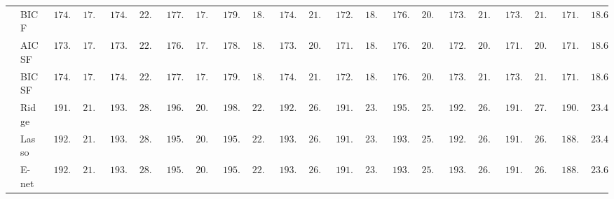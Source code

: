 \begin{tabular}{p{0.2cm}p{1cm}|p{0.6cm}p{0.6cm}|p{0.6cm}p{0.6cm}p{0.6cm}p{0.6cm}p{0.6cm}p{0.6cm}|p{0.6cm}p{0.6cm}p{0.6cm}p{0.6cm}p{0.6cm}p{0.6cm}|p{0.6cm}p{0.6cm}p{0.6cm}p{0.6cm}p{0.6cm}p{0.6cm}}
 & BIC F  & $\phantom{0}174.33$ & $\phantom{0}17.71$ & $\phantom{0}174.93$ & $\phantom{0}22.61$ & $\phantom{0}177.92$ & $\phantom{0}17.21$ & $\phantom{0}179.05$ & $\phantom{0}18.33$ & $\phantom{0}174.65$ & $\phantom{0}21.00$ & $\phantom{0}172.92$ & $\phantom{0}18.72$ & $\phantom{0}176.85$ & $\phantom{0}20.99$ & $\phantom{0}173.70$ & $\phantom{0}21.08$ & $\phantom{0}173.01$ & $\phantom{0}21.03$ & $\phantom{0}171.97$ & $\phantom{0}18.65$ \\
 & AIC SF  & $\phantom{0}173.23$ & $\phantom{0}17.57$ & $\phantom{0}173.84$ & $\phantom{0}22.43$ & $\phantom{0}176.76$ & $\phantom{0}17.03$ & $\phantom{0}178.14$ & $\phantom{0}18.35$ & $\phantom{0}173.35$ & $\phantom{0}20.89$ & $\phantom{0}171.88$ & $\phantom{0}18.53$ & $\phantom{0}176.00$ & $\phantom{0}20.94$ & $\phantom{0}172.67$ & $\phantom{0}20.86$ & $\phantom{0}171.87$ & $\phantom{0}20.90$ & $\phantom{0}171.12$ & $\phantom{0}18.64$ \\
 & BIC SF  & $\phantom{0}174.33$ & $\phantom{0}17.71$ & $\phantom{0}174.93$ & $\phantom{0}22.61$ & $\phantom{0}177.92$ & $\phantom{0}17.21$ & $\phantom{0}179.05$ & $\phantom{0}18.33$ & $\phantom{0}174.65$ & $\phantom{0}21.00$ & $\phantom{0}172.92$ & $\phantom{0}18.72$ & $\phantom{0}176.85$ & $\phantom{0}20.99$ & $\phantom{0}173.70$ & $\phantom{0}21.08$ & $\phantom{0}173.01$ & $\phantom{0}21.03$ & $\phantom{0}171.97$ & $\phantom{0}18.65$ \\
 & Ridge  & $\phantom{0}191.77$ & $\phantom{0}21.86$ & $\phantom{0}193.35$ & $\phantom{0}28.38$ & $\phantom{0}196.58$ & $\phantom{0}20.41$ & $\phantom{0}198.62$ & $\phantom{0}22.26$ & $\phantom{0}192.24$ & $\phantom{0}26.55$ & $\phantom{0}191.25$ & $\phantom{0}23.18$ & $\phantom{0}195.76$ & $\phantom{0}25.24$ & $\phantom{0}192.23$ & $\phantom{0}26.69$ & $\phantom{0}191.67$ & $\phantom{0}27.17$ & $\phantom{0}190.39$ & $\phantom{0}23.43$ \\
 & Lasso  & $\phantom{0}192.92$ & $\phantom{0}21.58$ & $\phantom{0}193.63$ & $\phantom{0}28.26$ & $\phantom{0}195.37$ & $\phantom{0}20.09$ & $\phantom{0}195.62$ & $\phantom{0}22.02$ & $\phantom{0}193.27$ & $\phantom{0}26.27$ & $\phantom{0}191.51$ & $\phantom{0}23.06$ & $\phantom{0}193.37$ & $\phantom{0}25.25$ & $\phantom{0}192.81$ & $\phantom{0}26.10$ & $\phantom{0}191.13$ & $\phantom{0}26.68$ & $\phantom{0}188.30$ & $\phantom{0}23.49$ \\
 & E-net  & $\phantom{0}192.95$ & $\phantom{0}21.60$ & $\phantom{0}193.65$ & $\phantom{0}28.26$ & $\phantom{0}195.37$ & $\phantom{0}20.35$ & $\phantom{0}195.31$ & $\phantom{0}22.27$ & $\phantom{0}193.24$ & $\phantom{0}26.49$ & $\phantom{0}191.32$ & $\phantom{0}23.18$ & $\phantom{0}193.10$ & $\phantom{0}25.02$ & $\phantom{0}193.00$ & $\phantom{0}26.33$ & $\phantom{0}191.15$ & $\phantom{0}26.74$ & $\phantom{0}188.00$ & $\phantom{0}23.68$ \\

\end{tabular}
